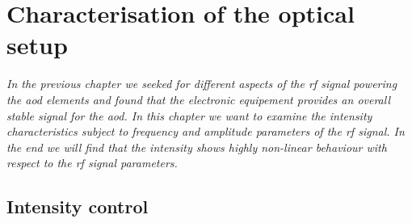 \chapter{Characterisation of the optical setup}

\textit{In the previous chapter we seeked for different aspects of the
\gls{rf} signal powering the \gls{aod} elements and found that the
electronic equipement provides an overall stable signal for the \gls{aod}.
In this chapter we want to examine the intensity characteristics subject
to frequency and amplitude parameters of the \gls{rf} signal. In the end
we will find that the intensity shows highly non-linear behaviour with
respect to the \gls{rf} signal parameters.}

\section{Intensity control}

